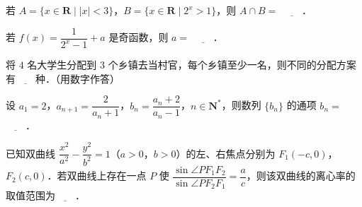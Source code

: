 \begin{question}
若 $A=\{x\in\mathbf R\mid |x|<3\}$，$B=\{x\in\mathbf R\mid 2^x>1\}$，则 $A\cap B=$ $\underline{\qquad}$．

\end{question}
\begin{question}
若 $f(x)=\dfrac1{2^x-1}+a$ 是奇函数，则 $a=$ $\underline{\qquad}$．

\end{question}
\begin{question}
将 $4$ 名大学生分配到 $3$ 个乡镇去当村官，每个乡镇至少一名，则不同的分配方案有$\underline{\qquad}$种．（用数字作答）

\end{question}
\begin{question}
设 $a_1=2$，$a_{n+1}=\dfrac2{a_n+1}$，$b_n=\dfrac{a_n+2}{a_n-1}$，$n\in\mathbf N^*$，则数列 $\{b_n\}$ 的通项 $b_n=$ $\underline{\qquad}$．

\end{question}
\begin{question}
已知双曲线 $\dfrac{x^2}{a^2}-\dfrac{y^2}{b^2}=1$（$a>0$，$b>0$）的左、右焦点分别为 $F_1(-c,0)$，$F_2(c,0)$．若双曲线上存在一点 $P$ 使 $\dfrac{\sin\angle PF_1F_2}{\sin\angle PF_2F_1}=\dfrac ac$，则该双曲线的离心率的取值范围为$\underline{\qquad}$．

\end{question}

